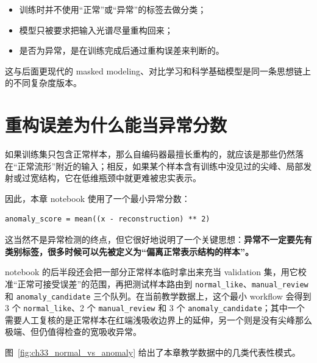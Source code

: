 \begin{itemize}
    \item 训练时并不使用“正常”或“异常”的标签去做分类；
    \item 模型只被要求把输入光谱尽量重构回来；
    \item 是否为异常，是在训练完成后通过重构误差来判断的。
\end{itemize}

这与后面更现代的 masked modeling、对比学习和科学基础模型是同一条思想链上的不同复杂度版本。

\section{重构误差为什么能当异常分数}

如果训练集只包含正常样本，那么自编码器最擅长重构的，就应该是那些仍然落在“正常流形”附近的输入；相反，如果某个样本含有训练中没见过的尖峰、局部发射或过宽结构，它在低维瓶颈中就更难被忠实表示。

因此，本章 notebook 使用了一个最小异常分数：

\begin{examplebox}[最小异常分数]
\begin{lstlisting}[style=pythonstyle]
anomaly_score = mean((x - reconstruction) ** 2)
\end{lstlisting}
\end{examplebox}

这当然不是异常检测的终点，但它很好地说明了一个关键思想：\textbf{异常不一定要先有类别标签，很多时候可以先被定义为“偏离正常表示结构的样本”。}

notebook 的后半段还会把一部分正常样本临时拿出来充当 validation 集，用它校准“正常可接受误差”的范围，再把测试样本路由到 \texttt{normal\_like}、\texttt{manual\_review} 和 \texttt{anomaly\_candidate} 三个队列。在当前教学数据上，这个最小 workflow 会得到 3 个 \texttt{normal\_like}、2 个 \texttt{manual\_review} 和 3 个 \texttt{anomaly\_candidate}；其中一个需要人工复核的是正常样本在红端浅吸收边界上的延伸，另一个则是没有尖峰那么极端、但仍值得检查的宽吸收异常。

图~\ref{fig:ch33_normal_vs_anomaly} 给出了本章教学数据中的几类代表性模式。

